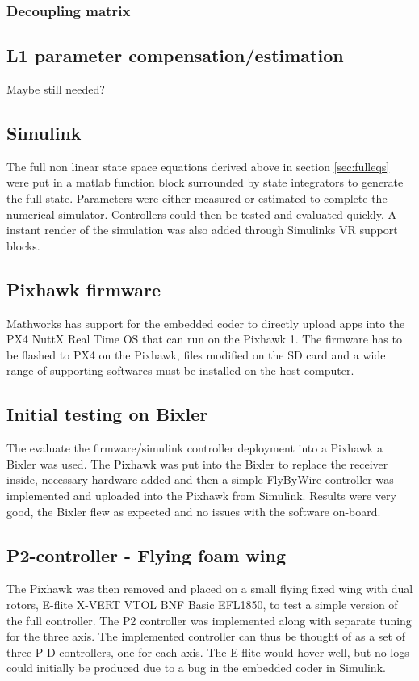 \documentclass{article}
\begin{document}
\subsubsection{Decoupling matrix}
\subsection{L1 parameter compensation/estimation}
Maybe still needed?


\subsection{Simulink}
The full non linear state space equations derived above in section \ref{sec:fulleqs} were put in a matlab function block surrounded by state integrators to generate the full state.
Parameters were either measured or estimated to complete the numerical simulator.
Controllers could then be tested and evaluated quickly.
A instant render of the simulation was also added through Simulinks VR support blocks.

\subsection{Pixhawk firmware}
Mathworks has support for the embedded coder to directly upload apps into the PX4 NuttX Real Time OS that can run on the Pixhawk 1.
The firmware has to be flashed to PX4 on the Pixhawk, files modified on the SD card and a wide range of supporting softwares must be installed on the host computer.

\subsection{Initial testing on Bixler}
The evaluate the firmware/simulink controller deployment into a Pixhawk a Bixler was used.
The Pixhawk was put into the Bixler to replace the receiver inside, necessary hardware added and then a simple FlyByWire controller was implemented and uploaded into the Pixhawk from Simulink.
Results were very good, the Bixler flew as expected and no issues with the software on-board.
\subsection{P2-controller - Flying foam wing}
The Pixhawk was then removed and placed on a small flying fixed wing with dual rotors, E-flite X-VERT VTOL BNF Basic EFL1850, to test a simple version of the full controller.
The P2 controller \cite{P2} was implemented along with separate tuning for the three axis.
The implemented controller can thus be thought of as a set of three P-D controllers, one for each axis.
The E-flite would hover well, but no logs could initially be produced due to a bug in the embedded coder in Simulink.
\end{document}
